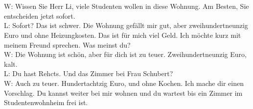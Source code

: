 \\
\\
\noindent
W: Wissen Sie Herr Li, viele Studenten wollen in diese Wohnung. Am Besten, Sie entscheiden jetzt sofort.  \\
L: Sofort? Das ist schwer.
Die Wohnung gefällt mir gut, aber zweihundertneunzig Euro und ohne Heizungkosten.
Das ist für mich viel Geld. Ich möchte kurz mit meinem Freund sprechen.
Was meinst du? \\
W: Die Wohnung ist schön, aber für dich ist zu teuer. Zweihundertneunzig Euro, kalt. \\
L: Du hast Rehcts. Und das Zimmer bei Frau Schubert? \\
W: Auch zu teuer. Hundertachtzig Euro, und ohne Kochen. Ich mache dir einen Vorschlag. 
Du kannst weiter bei mir wohnen und du wartest bis ein Zimmer im Studentenwohnheim frei ist. \\

